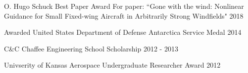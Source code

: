 
\begin{cvhonors}
  \cvawardentry
    {O. Hugo Schuck Best Paper Award \quad{}} %
    {For paper: ``Gone with the wind: Nonlinear Guidance for Small Fixed-wing Aircraft in Arbitrarily Strong Windfields"} %
    {2018} %

  \cvawardentry
    {Awarded United States Department of Defense Antarctica Service Medal} %
    {} %
    {2014} %

%
  \cvawardentry
    {C\&C Chaffee Engineering School Scholarship} %
    {} %
    {2012 - 2013} %

  \cvawardentry
    {Univserity of Kansas Aerospace Undergraduate Researcher Award} %
    {} %
    {2012} %

\end{cvhonors}
